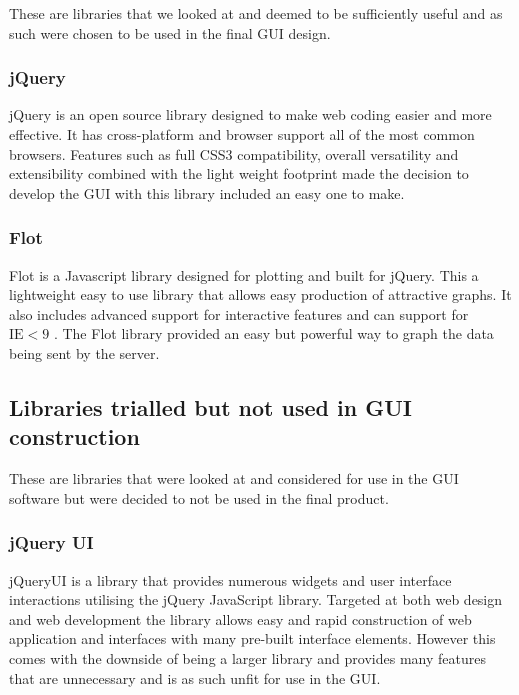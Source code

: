 These are libraries that we looked at and deemed to be sufficiently useful and as such were chosen to be used in the final GUI design.

\subsubsection{jQuery} \label{jQuery}

jQuery\cite{jQuery} is an open source library designed to make web coding easier and more effective.  It has cross-platform and browser support all of the most common browsers.  Features such as full CSS3 compatibility, overall versatility and extensibility combined with the light weight footprint made the decision to develop the GUI with this library included an easy one to make. 

\subsubsection{Flot}

Flot\cite{flot} is a Javascript library designed for plotting and built for jQuery.  This a lightweight easy to use library that allows easy production of attractive graphs.  It also includes advanced support for interactive features and can support for $\text{IE} < 9$ .  The Flot library provided an easy but powerful way to graph the data being sent by the server.


\subsection{Libraries trialled but not used in GUI construction}

These are libraries that were looked at and considered for use in the GUI software but were decided to not be used in the final product.

\subsubsection{jQuery UI}

jQueryUI\cite{jQueryUI} is a library that provides numerous widgets and user interface interactions utilising the jQuery JavaScript library.  Targeted at both web design and web development the library allows easy and rapid construction of web application and interfaces with many pre-built interface elements.  However this comes with the downside of being a larger library and provides many features that are unnecessary and is as such unfit for use in the GUI.

